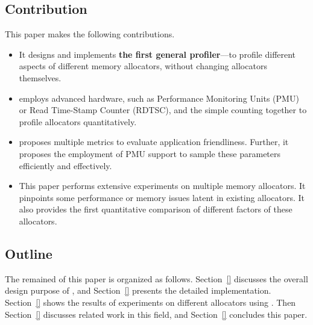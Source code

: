  
\subsection*{Contribution}

This paper makes the following contributions. 

\begin{itemize}
\item It designs and implements \textbf{the first general profiler}--\MP{}--to profile different aspects of different memory allocators, without changing allocators themselves.  

\item \MP{} employs advanced hardware, such as Performance Monitoring Units (PMU) or Read Time-Stamp Counter (RDTSC), and the simple counting together to profile allocators quantitatively. 

\item \MP{} proposes multiple metrics to evaluate application friendliness. Further, it proposes the employment of PMU support to sample these parameters efficiently and effectively. 

\item This paper performs extensive experiments on multiple memory allocators. It pinpoints some performance or memory issues latent in existing allocators. It also provides the first quantitative comparison of different factors of these allocators.  

\end{itemize} 

\subsection*{Outline}

The remained of this paper is organized as follows. Section~\ref{} discusses the overall design purpose of \MP{}, and Section~\ref{} presents the detailed implementation. Section~\ref{} shows the results of experiments on different allocators using \MP{}. Then Section~\ref{} discusses related work in this field, and Section~\ref{} concludes this paper. 